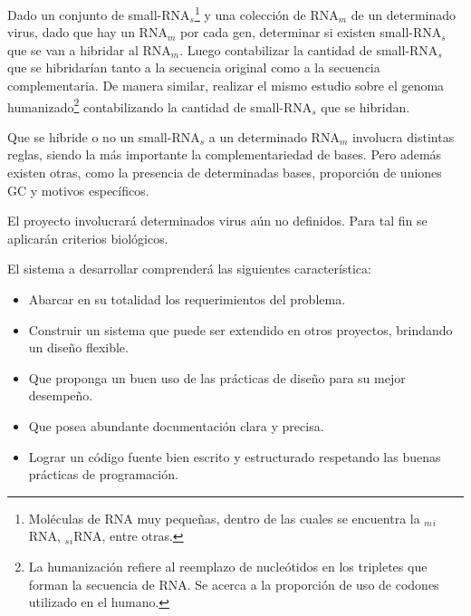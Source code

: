 \documentclass[12pt,a4paper,spanish]{article}
\begin{document}
\par Dado un conjunto de small-RNA$_s$\footnote{Moléculas de RNA muy pequeñas, dentro de las cuales se encuentra la $_m$$_i$RNA, $_s$$_i$RNA, entre otras.} y una colección de RNA$_m$ de un determinado virus, dado que hay un RNA$_m$ por cada gen, determinar si existen small-RNA$_s$ que se van a hibridar al RNA$_m$. Luego contabilizar la cantidad de small-RNA$_s$ que se hibridarían tanto a la secuencia original como a la secuencia complementaria. De manera similar, realizar el mismo estudio sobre el genoma humanizado\footnote{La humanización refiere al reemplazo de nucleótidos en los tripletes que forman la secuencia de RNA. Se acerca a la proporción de uso de codones utilizado en el humano.} contabilizando la cantidad de small-RNA$_s$ que se hibridan. 
\par Que se hibride o no un small-RNA$_s$ a un determinado RNA$_m$ involucra distintas reglas, siendo la más importante la complementariedad de bases. Pero además existen otras, como la presencia de determinadas bases, proporción de uniones GC y motivos específicos.

\par El proyecto involucrará determinados virus aún no definidos. Para tal fin se aplicarán criterios biológicos.

\par El sistema a desarrollar comprenderá las siguientes característica:
\begin{itemize}
	\item Abarcar en su totalidad los requerimientos del problema.
	\item Construir un sistema que puede ser extendido en otros proyectos, brindando un diseño flexible. 
	\item Que proponga un buen uso de las prácticas de diseño para su mejor desempeño.
	\item Que posea abundante documentación clara y precisa.
	\item Lograr un código fuente bien escrito y estructurado respetando las buenas prácticas de programación.
\end{itemize}
\end{document}
